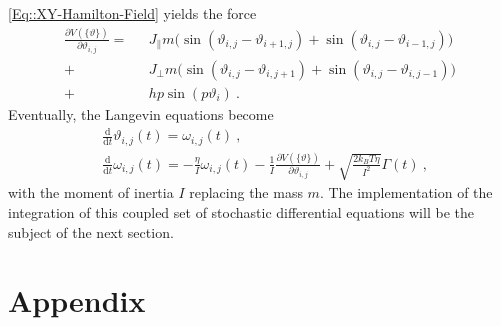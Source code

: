 	\autoref{Eq::XY-Hamilton-Field} yields the force
	\begin{equation} \label{Eq::Potential-Derivative}
		\begin{split}
			\frac{\partial V(\{\vartheta\})}{\partial \vartheta_{i, j}} = ~~~& J_\parallel m \Big( \sin \left(\vartheta_{i,j} - \vartheta_{i + 1, j} \right) +   \sin \left(\vartheta_{i,j} - \vartheta_{i-1, j} \right) \Big)	 \\
			+ &J_\perp m \Big( \sin \left(\vartheta_{i,j} - \vartheta_{i, j+1} \right) +  \sin \left(\vartheta_{i,j} - \vartheta_{i, j-1} \right) \Big) \\
			+ &h p \sin(p\vartheta_i)~.
		\end{split}
	\end{equation}
	Eventually, the Langevin equations become
	\begin{align}
		&\frac{\text{d}}{\text{d}t} \vartheta_{i,j}(t) =	 \omega_{i,j}(t)~, \label{Eq::Si-Langevin-theta} \\
		&\frac{\text{d}}{\text{d}t} \omega_{i,j}(t) =	- \frac{\eta}{I} \omega_{i,j}(t) - \frac{1}{I}\frac{\partial V(\{\vartheta\})}{\partial \vartheta_{i,j}} + \sqrt{\frac{2 k_B T \eta}{I^2}} \Gamma(t)~, \label{Eq::Si-Langevin-omega}
	\end{align}
	with the moment of inertia $I$ replacing the mass $m$. The implementation of the integration of this coupled set of stochastic differential equations will be the subject of the next section.
	
	
	\appendix
	\chapter{Appendix}
